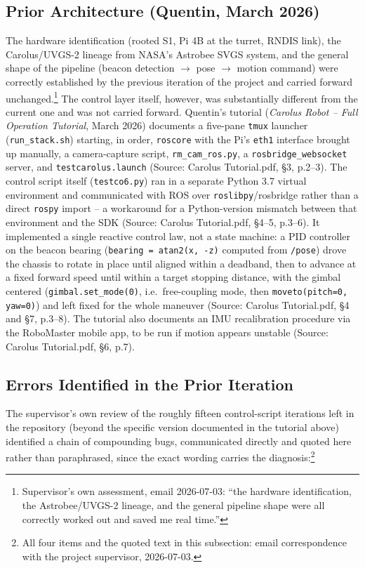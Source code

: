 \documentclass[11pt]{article}
\begin{document}
\subsection{Prior Architecture (Quentin, March 2026)}
The hardware identification (rooted S1, Pi 4B at the turret, RNDIS link),
the Carolus/UVGS-2 lineage from NASA's Astrobee SVGS system, and the general
shape of the pipeline (beacon detection $\to$ pose $\to$ motion command)
were correctly established by the previous iteration of the project and
carried forward unchanged.\footnote{Supervisor's own assessment, email
2026-07-03: ``the hardware identification, the Astrobee/UVGS-2 lineage, and
the general pipeline shape were all correctly worked out and saved me real
time.''} The control layer itself, however, was substantially different
from the current one and was not carried forward. Quentin's tutorial
(\emph{Carolus Robot -- Full Operation Tutorial}, March 2026) documents a
five-pane \texttt{tmux} launcher (\texttt{run\_stack.sh}) starting, in
order, \texttt{roscore} with the Pi's \texttt{eth1} interface brought up
manually, a camera-capture script, \texttt{rm\_cam\_ros.py}, a
\texttt{rosbridge\_websocket} server, and \texttt{testcarolus.launch}
(Source: Carolus Tutorial.pdf, \S3, p.2--3). The control script itself
(\texttt{testco6.py}) ran in a separate Python 3.7 virtual environment and
communicated with ROS over \texttt{roslibpy}/rosbridge rather than a direct
\texttt{rospy} import -- a workaround for a Python-version mismatch between
that environment and the SDK (Source: Carolus Tutorial.pdf, \S4--5,
p.3--6). It implemented a single reactive control law, not a state machine:
a PID controller on the beacon bearing (\texttt{bearing = atan2(x, -z)}
computed from \texttt{/pose}) drove the chassis to rotate in place until
aligned within a deadband, then to advance at a fixed forward speed until
within a target stopping distance, with the gimbal centered
(\texttt{gimbal.set\_mode(0)}, i.e.\ free-coupling mode, then
\texttt{moveto(pitch=0, yaw=0)}) and left fixed for the whole
maneuver (Source: Carolus Tutorial.pdf, \S4 and \S7, p.3--8). The tutorial
also documents an IMU recalibration procedure via the RoboMaster mobile app,
to be run if motion appears unstable (Source: Carolus Tutorial.pdf, \S6,
p.7).

\subsection{Errors Identified in the Prior Iteration}
\label{sec:prior-bugs}
The supervisor's own review of the roughly fifteen control-script
iterations left in the repository (beyond the specific version documented
in the tutorial above) identified a chain of compounding bugs, communicated
directly and quoted here rather than paraphrased, since the exact wording
carries the diagnosis:\footnote{All four items and the quoted text in this
subsection: email correspondence with the project supervisor, 2026-07-03.}
\end{document}
